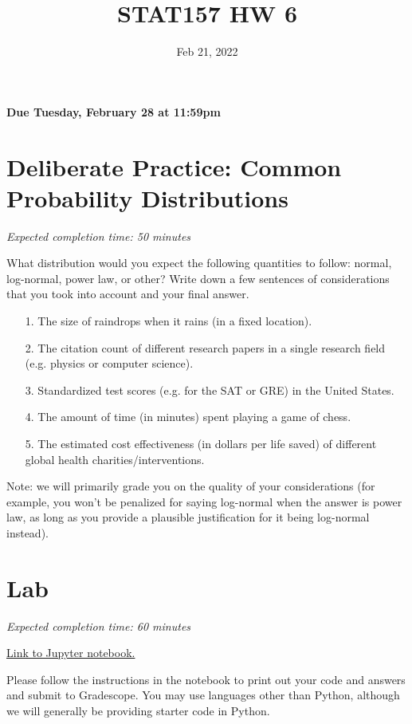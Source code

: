 \documentclass[11pt]{article}
\title{STAT157 HW 6}
\date{Feb 21, 2022}
\begin{document}
\maketitle

\hfill \textbf{Due Tuesday, February 28 at 11:59pm}

\section*{Deliberate Practice: Common Probability Distributions}

\emph{Expected completion time: 50 minutes}

What distribution would you expect the following quantities to follow: normal, log-normal, power law, or other? Write down a few sentences of considerations that you took into account and your final answer. 

\begin{enumerate}
	\item[1.] The size of raindrops when it rains (in a fixed location).
	\item[2.] The citation count of different research papers in a single research field (e.g. physics or computer science).
	\item[3.] Standardized test scores (e.g. for the SAT or GRE) in the United States.
	\item[4.] The amount of time (in minutes) spent playing a game of chess.
	\item[5.] The estimated cost effectiveness (in dollars per life saved) of different global health charities/interventions.
\end{enumerate}

Note: we will primarily grade you on the quality of your considerations (for example, you won't be penalized for saying log-normal when the answer is power law, as long as you provide a plausible justification for it being log-normal instead).

\section*{Lab}

\emph{Expected completion time: 60 minutes}

\href{https://datahub.berkeley.edu/hub/user-redirect/git-pull?repo=https%3A%2F%2Fgithub.com%2Fjs-d%2Fstat-157-260-website&urlpath=tree%2Fstat-157-260-website%2Fhw%2Fhw6%2Fhw6lab.ipynb&branch=main}{Link to Jupyter notebook.}

Please follow the instructions in the notebook to print out your code and answers and submit to Gradescope. You may use languages other than Python, although we will generally be providing starter code in Python.
\end{document}
